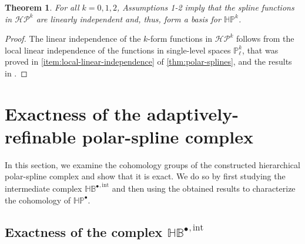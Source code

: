 \documentclass[10pt]{article}
\newcommand{\basis}[1]{\mathcal{#1}}
\newcommand{\vSpace}[1]{\mathbb{#1}}
\newcommand{\complex}[1]{\mathit{\vSpace{#1}^\bullet}}
\newcommand{\bsp}{B}
\newcommand{\polar}{P}
\newcommand{\polarS}{\vSpace{\polar}}
\newcommand{\tint}{\mathrm{int}}
\newcommand{\hSpace}[1]{\mathit{\vSpace{H}\vSpace{#1}}}
\newcommand{\hBasis}[1]{\mathit{\basis{H}\basis{#1}}}
\newcommand{\hintComplex}{\complex{H\bsp}^{,\tint}}
\newcommand{\hpolarComplex}{\complex{H\polar}}
\theoremstyle{plain}
\newtheorem{theorem}{Theorem}[section]
\theoremstyle{definition}
\theoremstyle{remark}
\begin{document}
\begin{theorem}\label{thm:polar-linear-ind}
    For all $k = 0, 1, 2$, Assumptions 1-2 imply that the spline functions in $\hBasis{\polar}^k$ are linearly independent and, thus, form a basis for $\hSpace{\polar}^k$.
\end{theorem}
\begin{proof}
    The linear independence of the $k$-form functions in $\hBasis{\polar}^k$ follows from the local linear independence of the functions in single-level spaces $\polarS^{k}_\ell$, that was proved in \cref{item:local-linear-independence} of \cref{thm:polar-splines}, and the results in \cite{Giannelli:2014}.
\end{proof}

\section{Exactness of the adaptively-refinable polar-spline complex}
\label{sec:exactness-polar}
In this section, we examine the cohomology groups of the constructed hierarchical polar-spline complex and show that it is exact.
We do so by first studying the intermediate complex $\hintComplex$ and then using the obtained results to characterize the cohomology of $\hpolarComplex$.

\subsection{Exactness of the complex $\complex{\hSpace{\bsp}}^{,\tint}$}
\label{sec:exactness-hb}
\end{document}
